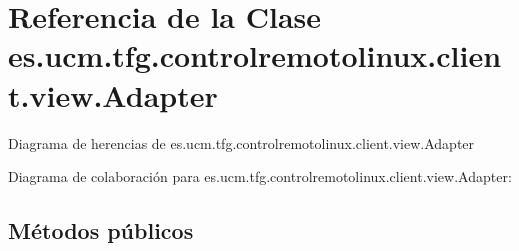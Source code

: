 \hypertarget{classes_1_1ucm_1_1tfg_1_1controlremotolinux_1_1client_1_1view_1_1Adapter}{\section{Referencia de la Clase es.\-ucm.\-tfg.\-controlremotolinux.\-client.\-view.\-Adapter}
\label{classes_1_1ucm_1_1tfg_1_1controlremotolinux_1_1client_1_1view_1_1Adapter}
}


Diagrama de herencias de es.\-ucm.\-tfg.\-controlremotolinux.\-client.\-view.\-Adapter


Diagrama de colaboración para es.\-ucm.\-tfg.\-controlremotolinux.\-client.\-view.\-Adapter\-:
\subsection*{Métodos públicos}
